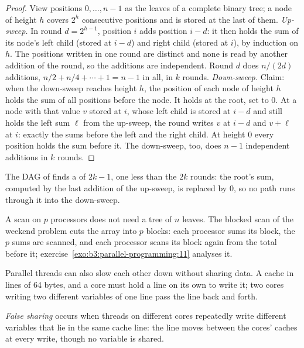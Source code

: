 \begin{proof}
View positions $0, \ldots, n - 1$ as the leaves of a complete binary tree; a node of height $h$ covers $2^h$ consecutive positions and is stored at the last of them. \emph{Up-sweep.} In round $d = 2^{h-1}$, position $i$ adds position $i - d$: it then holds the sum of its node's left child (stored at $i - d$) and right child (stored at $i$), by induction on $h$. The positions written in one round are distinct and none is read by another addition of the round, so the additions are independent. Round $d$ does $n/(2d)$ additions, $n/2 + n/4 + \cdots + 1 = n - 1$ in all, in $k$ rounds. \emph{Down-sweep.} Claim: when the down-sweep reaches height $h$, the position of each node of height $h$ holds the sum of all positions before the node. It holds at the root, set to 0. At a node with that value $v$ stored at $i$, whose left child is stored at $i - d$ and still holds the left sum $\ell$ from the up-sweep, the round writes $v$ at $i - d$ and $v + \ell$ at $i$: exactly the sums before the left and the right child. At height 0 every position holds the sum before it. The down-sweep, too, does $n - 1$ independent additions in $k$ rounds.
\end{proof}

The DAG of  finds a  of $2k - 1$, one less than the $2k$ rounds: the root's sum, computed by the last addition of the up-sweep, is replaced by 0, so no path runs through it into the down-sweep.

A scan on $p$ processors does not need a tree of $n$ leaves. The blocked scan of the weekend problem cuts the array into $p$ blocks: each processor sums its block, the $p$ sums are scanned, and each processor scans its block again from the total before it; exercise~\ref{exo:b3:parallel-programming:11} analyses it.

Parallel threads can also slow each other down without sharing data. A cache  in lines of 64 bytes, and a core must hold a line on its own to write it; two cores writing two different variables of one line pass the line back and forth.

\begin{definition}\label{def:b3:parallel-programming:false-sharing}
\emph{False sharing} occurs when threads on different cores repeatedly write different variables that lie in the same cache line: the line moves between the cores' caches at every write, though no variable is shared.
\end{definition}


